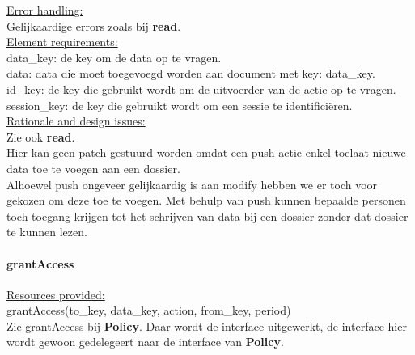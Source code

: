 \documentclass[a4paper,10pt]{article}
\begin{document}
\underline{Error handling:}\\
Gelijkaardige errors zoals bij \textbf{read}.\\

\underline{Element requirements:}\\
data\_key: de key om de data op te vragen.\\
data: data die moet toegevoegd worden aan document met key: data\_key.\\
id\_key: de key die gebruikt wordt om de uitvoerder van de actie op te vragen.\\
session\_key: de key die gebruikt wordt om een sessie te identifici\"{e}ren.\\

\underline{Rationale and design issues:}\\
Zie ook \textbf{read}.\\
Hier kan geen patch gestuurd worden omdat een push actie enkel toelaat nieuwe data toe te voegen aan een dossier.\\
Alhoewel push ongeveer gelijkaardig is aan modify hebben we er toch voor gekozen om deze toe te voegen.  Met behulp van push kunnen bepaalde personen toch toegang krijgen tot het schrijven van data bij een dossier zonder dat dossier te kunnen lezen.

\paragraph{grantAccess}
\underline{Resources provided:}\\
grantAccess(to\_key, data\_key, action, from\_key, period)\\
Zie grantAccess bij \textbf{Policy}.  Daar wordt de interface uitgewerkt, de interface hier wordt gewoon gedelegeert naar de interface van \textbf{Policy}.
\end{document}
